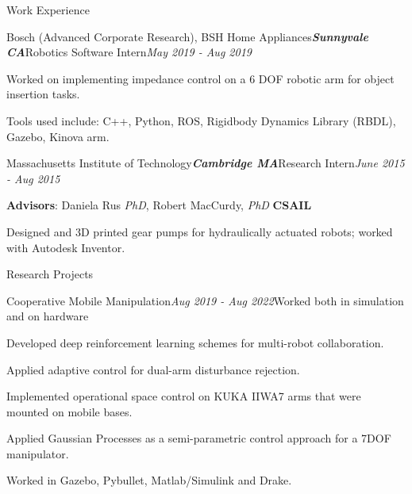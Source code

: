 \documentclass{resume} %
\begin{document}
\begin{rSection}{Work Experience}
\begin{rSubsection}{Bosch (Advanced Corporate Research), BSH Home Appliances}{\bf \em Sunnyvale CA}{Robotics Software Intern}{\em May 2019 - Aug 2019}
\item Worked on implementing impedance control on a 6 DOF robotic arm for object insertion tasks.
\item Tools used include: C++, Python, ROS, Rigidbody Dynamics Library (RBDL), Gazebo, Kinova arm.
\end{rSubsection}

\begin{rSubsection}{Massachusetts Institute of Technology}{\bf \em Cambridge MA}{Research Intern}{\em June 2015 - Aug 2015}
\item {\bf Advisors}: Daniela Rus {\em PhD},   Robert MacCurdy, {\em PhD} \hfill {\bf CSAIL}
\item Designed and 3D printed gear pumps for hydraulically actuated robots; worked with Autodesk Inventor.

\end{rSubsection}

\end{rSection}



\begin{rSection}{Research Projects}

\begin{rSubsection}{Cooperative Mobile Manipulation}{\em Aug 2019 - Aug 2022}{Worked both in simulation and on hardware}{}
\item Developed deep reinforcement learning schemes for multi-robot collaboration.
\item Applied adaptive control for dual-arm disturbance rejection.
\item Implemented operational space control on KUKA IIWA7 arms that were mounted on mobile bases.
\item Applied Gaussian Processes as a semi-parametric control approach for a 7DOF manipulator.
\item Worked in Gazebo, Pybullet, Matlab/Simulink and Drake.
\end{rSubsection}

\end{rSection}
\end{document}
